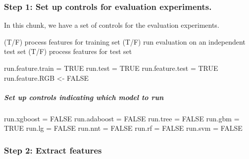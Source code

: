 \documentclass[]{article}
\newenvironment{Shaded}{\begin{snugshade}}{\end{snugshade}}
\newcommand{\StringTok}[1]{\textcolor[rgb]{0.31,0.60,0.02}{#1}}
\newcommand{\OtherTok}[1]{\textcolor[rgb]{0.56,0.35,0.01}{#1}}
\newcommand{\NormalTok}[1]{#1}
\let\oldsubparagraph\subparagraph
\renewcommand{\subparagraph}[1]{\oldsubparagraph{#1}\mbox{}}
\begin{document}
\subsubsection{Step 1: Set up controls for evaluation
experiments.}\label{step-1-set-up-controls-for-evaluation-experiments.}

In this chunk, we have a set of controls for the evaluation experiments.

(T/F) process features for training set (T/F) run evaluation on an
independent test set (T/F) process features for test set

\begin{Shaded}
\begin{Highlighting}[]
\NormalTok{run.feature.train =}\StringTok{ }\OtherTok{TRUE}    
\NormalTok{run.test =}\StringTok{ }\OtherTok{TRUE}
\NormalTok{run.feature.test =}\StringTok{ }\OtherTok{TRUE} 
\NormalTok{run.feature.RGB <-}\StringTok{ }\OtherTok{FALSE}
\end{Highlighting}
\end{Shaded}

\subparagraph{Set up controls indicating which model to
run}\label{set-up-controls-indicating-which-model-to-run}

\begin{Shaded}
\begin{Highlighting}[]
\NormalTok{run.xgboost =}\StringTok{ }\OtherTok{FALSE}
\NormalTok{run.adaboost =}\StringTok{ }\OtherTok{FALSE}
\NormalTok{run.tree =}\StringTok{ }\OtherTok{FALSE}
\NormalTok{run.gbm =}\StringTok{ }\OtherTok{TRUE}
\NormalTok{run.lg =}\StringTok{ }\OtherTok{FALSE}
\NormalTok{run.nnt =}\StringTok{ }\OtherTok{FALSE}
\NormalTok{run.rf =}\StringTok{ }\OtherTok{FALSE}
\NormalTok{run.svm =}\StringTok{ }\OtherTok{FALSE}
\end{Highlighting}
\end{Shaded}

\subsubsection{Step 2: Extract features}\label{step-2-extract-features}
\end{document}
